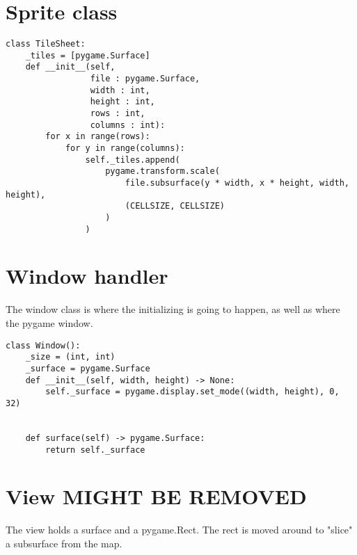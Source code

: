 \documentclass[11pt]{article}
\begin{document}
\section{Sprite class}
\label{sec:org2e7cb7d}

\begin{verbatim}
class TileSheet:
    _tiles = [pygame.Surface]
    def __init__(self,
                 file : pygame.Surface,
                 width : int,
                 height : int,
                 rows : int,
                 columns : int):
        for x in range(rows):
            for y in range(columns):
                self._tiles.append(
                    pygame.transform.scale(
                        file.subsurface(y * width, x * height, width, height),
                        (CELLSIZE, CELLSIZE)
                    )
                )
\end{verbatim}


\section{Window handler}
\label{sec:org68d23d3}

The window class is where the initializing is going to happen, as well as where the pygame window.


\begin{verbatim}
class Window():
    _size = (int, int)
    _surface = pygame.Surface
    def __init__(self, width, height) -> None:
        self._surface = pygame.display.set_mode((width, height), 0, 32)

        
    def surface(self) -> pygame.Surface:
        return self._surface
\end{verbatim}

\section{View MIGHT BE REMOVED}
\label{sec:org16278e8}

The view holds a surface and a pygame.Rect. The rect is moved around to "slice" a subsurface from the map. 
\end{document}
